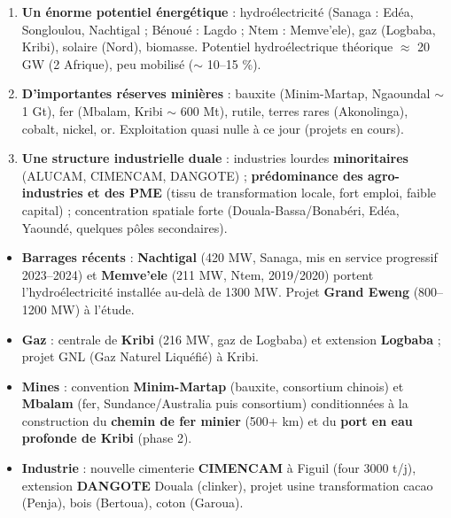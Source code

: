 \documentclass[11pt]{article}
\begin{document}
\begin{aretenir}
\begin{enumerate}
\item \textbf{Un énorme potentiel énergétique} : hydroélectricité (Sanaga : Edéa, Songloulou, Nachtigal ; Bénoué : Lagdo ; Ntem : Memve'ele), gaz (Logbaba, Kribi), solaire (Nord), biomasse. Potentiel hydroélectrique théorique $\approx$ 20 GW (2 Afrique), peu mobilisé ($\sim$ 10--15 \%).
\item \textbf{D'importantes réserves minières} : bauxite (Minim-Martap, Ngaoundal $\sim$ 1 Gt), fer (Mbalam, Kribi $\sim$ 600 Mt), rutile, terres rares (Akonolinga), cobalt, nickel, or. Exploitation quasi nulle à ce jour (projets en cours).
\item \textbf{Une structure industrielle duale} : industries lourdes \textbf{minoritaires} (ALUCAM, CIMENCAM, DANGOTE) ; \textbf{prédominance des agro-industries et des PME} (tissu de transformation locale, fort emploi, faible capital) ; concentration spatiale forte (Douala-Bassa/Bonabéri, Edéa, Yaoundé, quelques pôles secondaires).
\end{enumerate}
\end{aretenir}

\begin{savaistu}
\begin{itemize}
\item \textbf{Barrages récents} : \textbf{Nachtigal} (420 MW, Sanaga, mis en service progressif 2023--2024) et \textbf{Memve'ele} (211 MW, Ntem, 2019/2020) portent l'hydroélectricité installée au-delà de 1300 MW. Projet \textbf{Grand Eweng} (800--1200 MW) à l'étude.
\item \textbf{Gaz} : centrale de \textbf{Kribi} (216 MW, gaz de Logbaba) et extension \textbf{Logbaba} ; projet GNL (Gaz Naturel Liquéfié) à Kribi.
\item \textbf{Mines} : convention \textbf{Minim-Martap} (bauxite, consortium chinois) et \textbf{Mbalam} (fer, Sundance/Australia puis consortium) conditionnées à la construction du \textbf{chemin de fer minier} (500+ km) et du \textbf{port en eau profonde de Kribi} (phase 2).
\item \textbf{Industrie} : nouvelle cimenterie \textbf{CIMENCAM} à Figuil (four 3000 t/j), extension \textbf{DANGOTE} Douala (clinker), projet usine transformation cacao (Penja), bois (Bertoua), coton (Garoua).
\end{itemize}
\end{savaistu}
\end{document}
